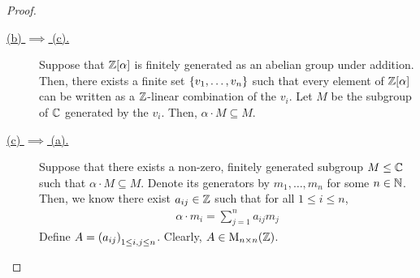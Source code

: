 \begin{proof}
\begin{description}
        \item[\underline{(b) $\implies$ (c).}] Suppose that $\mathbb{Z}\!\left[ \alpha \right]$ is finitely generated as an abelian group under addition. Then, there exists a finite set $\left\{ v_1, \ldots, v_n \right\}$ such that every element of $\mathbb{Z}\!\left[ \alpha \right]$ can be written as a $\mathbb{Z}$-linear combination of the $v_i$. Let $M$ be the subgroup of $\mathbb{C}$ generated by the $v_i$. Then, $\alpha \cdot M \subseteq M$.
        
        \item[\underline{(c) $\implies$ (a).}] Suppose that there exists a non-zero, finitely generated subgroup $M \leq \mathbb{C}$ such that $\alpha \cdot M \subseteq M$. Denote its generators by $m_1, \ldots, m_n$ for some $n \in \mathbb{N}$. Then, we know there exist $a_{ij} \in \mathbb{Z}$ such that for all $1 \leq i \leq n$,
        \begin{align*}
            \alpha \cdot m_i = \sum_{j=1}^{n} a_{ij} m_j
        \end{align*}
        Define $A = \left( a_{ij} \right)_{1 \leq i, j \leq n}$. Clearly, $A \in \operatorname{M}_{{n} \times {n}}\!\left( {\mathbb{Z}} \right)$.
    \end{description}
    
\end{proof}
